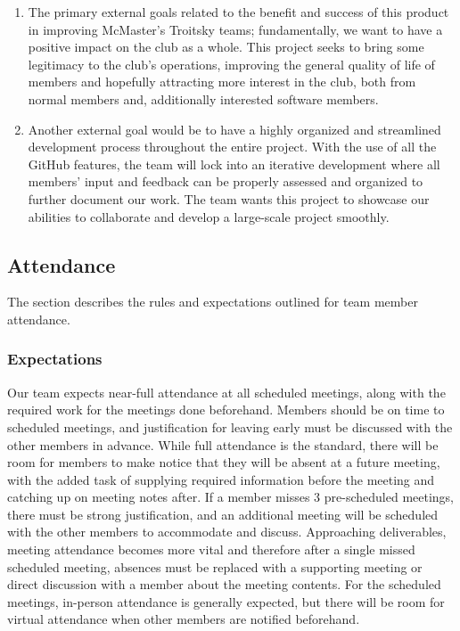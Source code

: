 \documentclass{article}
\begin{document}
\begin{enumerate}
    \item The primary external goals related to the benefit and success of this product in 
 improving McMaster's Troitsky teams; fundamentally, we want to have a positive impact on the club as a whole. 
 This project seeks to bring some legitimacy to the club's operations, improving the general quality of life of 
 members and hopefully attracting more interest in the club, both from normal members and, additionally 
 interested software members.

    \item Another external goal would be to have a highly organized and streamlined development process throughout 
 the entire project. With the use of all the GitHub features, the team will lock into an iterative development 
 where all members' input and feedback can be properly assessed and organized to further document our work. The 
 team wants this project to showcase our abilities to collaborate and develop a large-scale project smoothly.

\end{enumerate}

\subsection*{Attendance}

The section describes the rules and expectations outlined for team member attendance.

\subsubsection*{Expectations}

Our team expects near-full attendance at all scheduled meetings, along with the required work for the meetings 
done beforehand. Members should be on time to scheduled meetings, and justification for leaving early must be discussed 
with the other members in advance. While full attendance is the standard, there will be room for members to make 
notice that they will be absent at a future meeting, with the added task of supplying required information before the meeting and catching up on meeting notes after. 
If a member misses 3 pre-scheduled meetings, there must be strong justification, and an additional meeting will be scheduled with the other 
members to accommodate and discuss. Approaching deliverables, meeting attendance becomes more vital and therefore after a single missed scheduled meeting, 
absences must be replaced with a supporting meeting or direct discussion with a member about the meeting contents. For the 
scheduled meetings, in-person attendance is generally expected, but there will be room for virtual attendance when other 
members are notified beforehand. 
\end{document}
